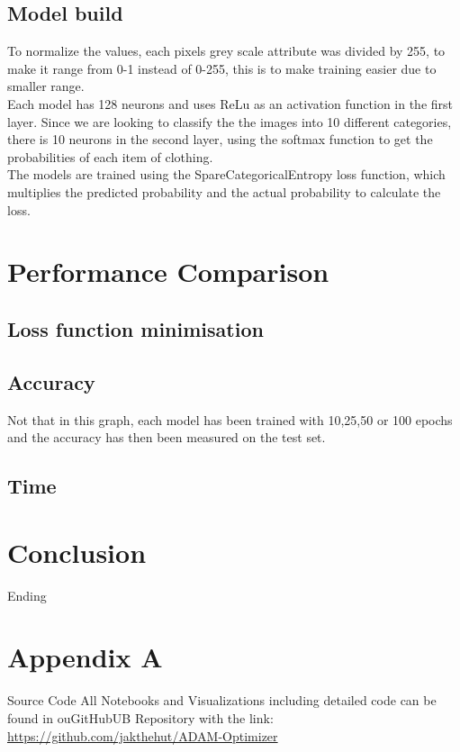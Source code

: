 \documentclass[oneside]{article}
\begin{document}
\subsection{Model build}
To normalize the values, each pixels grey scale attribute was divided by 255, to make it range from 0-1 instead of 0-255, this is to make training easier due to smaller range. \\

Each model has 128 neurons and uses ReLu as an activation function in the first layer. Since we are looking to classify the the images into 10 different categories, there is 10 neurons in the second layer, using the softmax function to get the probabilities of each item of clothing. \\

The models are trained using the SpareCategoricalEntropy loss function, which multiplies the predicted probability and the actual probability to calculate the loss. 


\section{Performance Comparison}
\subsection{Loss function minimisation}

\subsection{Accuracy}
Not that in this graph, each model has been trained with 10,25,50 or 100 epochs and the accuracy has then been measured on the test set. 

\subsection{Time} 

 
\section{Conclusion}
Ending




\onecolumn
\newpage
\pagestyle{fancy}


\section{Appendix A}
\centering Source Code
All Notebooks and Visualizations including detailed code can be found in ouGitHubUB Repository with the link: \href{https://github.com/jakthehut/ADAM-Optimizer}{https://github.com/jakthehut/ADAM-Optimizer}
\end{document}
